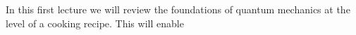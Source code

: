 In this first lecture we will review the foundations of quantum mechanics at the level of a cooking recipe. This will enable 